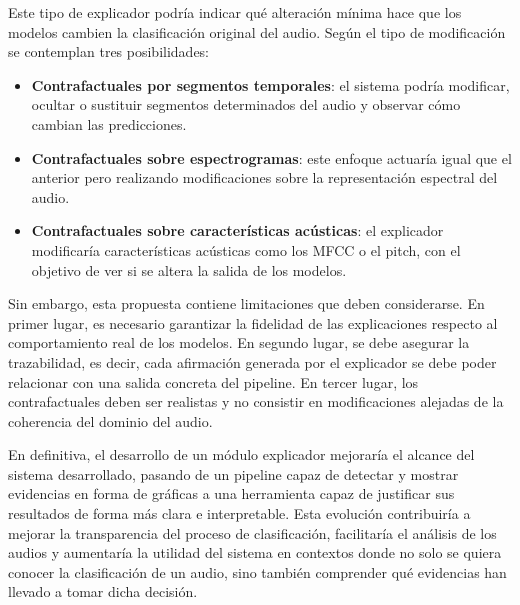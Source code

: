 Este tipo de explicador podría indicar qué alteración mínima hace que los modelos cambien la clasificación original del audio. Según el tipo de modificación se contemplan tres posibilidades:
\begin{itemize}
    \item \textbf{Contrafactuales por segmentos temporales}: el sistema podría modificar, ocultar o sustituir segmentos determinados del audio y observar cómo cambian las predicciones.
    \item \textbf{Contrafactuales sobre espectrogramas}: este enfoque actuaría igual que el anterior pero realizando modificaciones sobre la representación espectral del audio.
    \item \textbf{Contrafactuales sobre características acústicas}: el explicador modificaría características acústicas como los MFCC o el pitch, con el objetivo de ver si se altera la salida de los modelos.
\end{itemize}

Sin embargo, esta propuesta contiene limitaciones que deben considerarse. En primer lugar, es necesario garantizar la fidelidad de las explicaciones respecto al comportamiento real de los modelos. En segundo lugar, se debe asegurar la trazabilidad, es decir, cada afirmación generada por el explicador se debe poder relacionar con una salida concreta del pipeline. En tercer lugar, los contrafactuales deben ser realistas y no consistir en modificaciones alejadas de la coherencia del dominio del audio.

En definitiva, el desarrollo de un módulo explicador mejoraría el alcance del sistema desarrollado, pasando de un pipeline capaz de detectar y mostrar evidencias en forma de gráficas a una herramienta capaz de justificar sus resultados de forma más clara e interpretable. Esta evolución contribuiría a mejorar la transparencia del proceso de clasificación, facilitaría el análisis de los audios y aumentaría la utilidad del sistema en contextos donde no solo se quiera conocer la clasificación de un audio, sino también comprender qué evidencias han llevado a tomar dicha decisión.